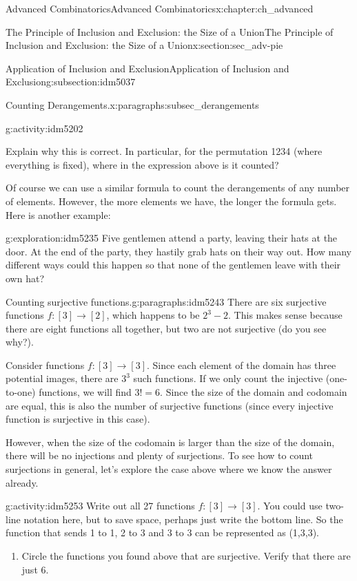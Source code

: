 \documentclass[oneside,10pt,]{book}
\numberwithin{equation}{chapter}
\begin{document}
\begin{chapterptx}{Advanced Combinatorics}{}{Advanced Combinatorics}{}{}{x:chapter:ch_advanced}
\begin{sectionptx}{The Principle of Inclusion and Exclusion: the Size of a Union}{}{The Principle of Inclusion and Exclusion: the Size of a Union}{}{}{x:section:sec_adv-pie}
\begin{subsectionptx}{Application of Inclusion and Exclusion}{}{Application of Inclusion and Exclusion}{}{}{g:subsection:idm5037}
\begin{paragraphs}{Counting Derangements.}{x:paragraphs:subsec_derangements}
\begin{activity}{}{g:activity:idm5202}
\begin{enumerate}[font=\bfseries,label=(\alph*),ref=\alph*]
\begin{equation*}
\end{equation*}
Explain why this is correct.  In particular, for the permutation 1234 (where everything is fixed), where in the expression above is it counted?%
\end{enumerate}
\end{activity}
Of course we can use a similar formula to count the derangements of any number of elements. However, the more elements we have, the longer the formula gets. Here is another example:%
\begin{exploration}{}{g:exploration:idm5235}%
Five gentlemen attend a party, leaving their hats at the door. At the end of the party, they hastily grab hats on their way out. How many different ways could this happen so that none of the gentlemen leave with their own hat?%
\end{exploration}
\end{paragraphs}%
\begin{paragraphs}{Counting surjective functions.}{g:paragraphs:idm5243}%
There are six surjective functions  \(f:[3]\to [2]\), which happens to be \(2^3 - 2\).  This makes sense because there are eight functions all together, but two are not surjective (do you see why?).%
\par
Consider functions \(f:[3]\to [3]\).  Since each element of the domain has three potential images, there are \(3^3\) such functions.  If we only count the injective (one-to-one) functions, we will find \(3! = 6\).  Since the size of the domain and codomain are equal, this is also the number of surjective functions (since every injective function is surjective in this case).%
\par
However, when the size of the codomain is larger than the size of the domain, there will be no injections and plenty of surjections.  To see how to count surjections in general, let's explore the case above where we know the answer already.%
\begin{activity}{}{g:activity:idm5253}%
Write out all 27 functions \(f:[3] \to [3]\).  You could use two-line notation here, but to save space, perhaps just write the bottom line.  So the function that sends 1 to 1, 2 to 3 and 3 to 3 can be represented as (1,3,3).\begin{enumerate}[font=\bfseries,label=(\alph*),ref=\alph*]
\item{}Circle the functions you found above that are surjective.  Verify that there are just 6.%

\end{enumerate}
\end{activity}
\end{paragraphs}
\end{subsectionptx}
\end{sectionptx}
\end{chapterptx}
\end{document}
